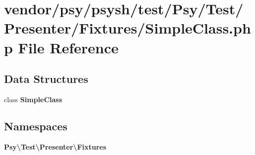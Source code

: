 \section{vendor/psy/psysh/test/\+Psy/\+Test/\+Presenter/\+Fixtures/\+Simple\+Class.php File Reference}
\label{_simple_class_8php}
\subsection*{Data Structures}
\begin{DoxyCompactItemize}
\item 
class {\bf Simple\+Class}
\end{DoxyCompactItemize}
\subsection*{Namespaces}
\begin{DoxyCompactItemize}
\item 
 {\bf Psy\textbackslash{}\+Test\textbackslash{}\+Presenter\textbackslash{}\+Fixtures}
\end{DoxyCompactItemize}
